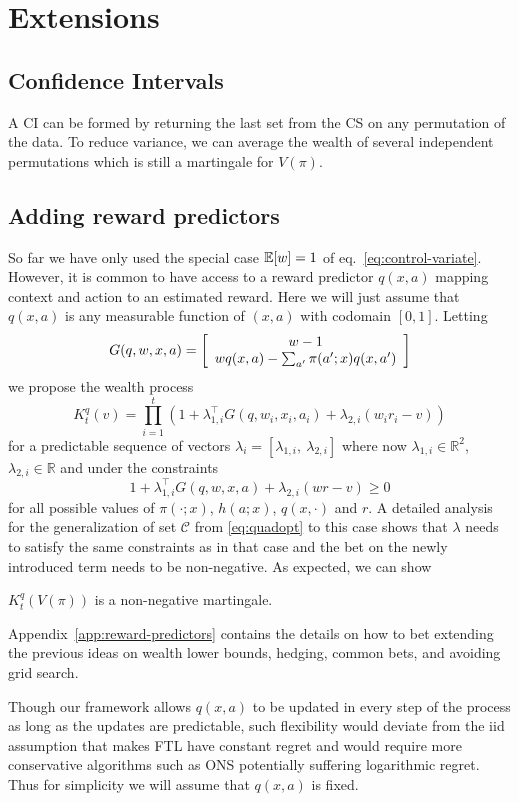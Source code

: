 \section{Extensions}

\subsection{Confidence Intervals}
A CI can be formed by returning the last set from the CS on any permutation of
the data.  To reduce variance, we can average the wealth of several independent
permutations which is still a martingale for $V(\pi)$.

\subsection{Adding reward predictors}
So far we have only used the special case $\mathbb{E}[w]=1$ of
eq.~\eqref{eq:control-variate}. However, it is common to have access to a
reward predictor $q(x,a)$ mapping context and action to an estimated reward.
Here we will just assume that $q(x,a)$ is any measurable function of $(x,a)$
with codomain $[0,1]$. Letting
\[
G(q,w,x,a)=\left[\begin{array}{c} w-1 \\ wq(x,a)-\sum_{a'}\pi(a';x)q(x,a') \end{array}\right]
\]
we propose the wealth process
\[
K_t^q(v)=\prod_{i=1}^{t}\left(1+\lambda_{1,i}^\top G(q,w_i,x_i,a_i)+\lambda_{2,i}(w_ir_i-v)\right)
\]
for a predictable sequence of vectors $\lambda_{i}=[\lambda_{1,i},\
\lambda_{2,i}]$ where now $\lambda_{1,i} \in \mathbb{R}^{2}$, $\lambda_{2,i}
\in \mathbb{R}$ and under the constraints 
\[
1+\lambda_{1,i}^\top G(q,w,x,a)+\lambda_{2,i}(wr-v) \geq 0 
\]
for all possible values of $\pi(\cdot;x)$, $h(a;x)$, $q(x,\cdot)$ and $r$.  A
detailed analysis for the generalization of set $\mathcal{C}$ from
\eqref{eq:quadopt} to this case shows that $\lambda$ needs to satisfy the same
constraints as in that case and the bet on the newly introduced term needs to
be non-negative. As expected, we can show
\begin{theorem}
$K_t^q(V(\pi))$ is a non-negative martingale.
\end{theorem}
Appendix~\ref{app:reward-predictors} contains the details on how to bet
extending the previous ideas on wealth lower bounds, hedging, common bets, and
avoiding grid search.

Though our framework allows $q(x,a)$ to be updated in every step of the process
as long as the updates are predictable, such flexibility would deviate from the
iid assumption that makes FTL have constant regret and would require more
conservative algorithms such as ONS potentially suffering logarithmic regret.
Thus for simplicity we will assume that $q(x,a)$ is fixed.

